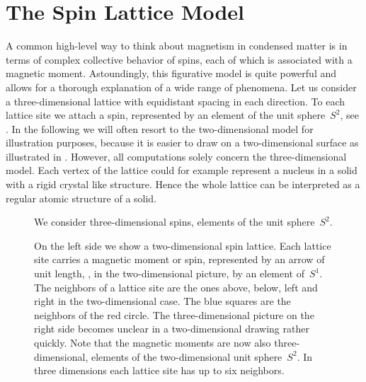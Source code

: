 \section{The Spin Lattice Model}\label{sec:model}
%
A common high-level way to think about magnetism in condensed matter is in terms
of complex collective behavior of spins, each of which is associated with a
magnetic moment. Astoundingly, this figurative model is quite powerful and
allows for a thorough explanation of a wide range of phenomena. Let us consider
a three-dimensional lattice with equidistant spacing in each direction. To each
lattice site we attach a spin, represented by an element of the unit
sphere~$S^2$, see . In the following we will often resort to the
two-dimensional model for illustration purposes, because it is easier to draw on
a two-dimensional surface as illustrated in . However, all
computations solely concern the three-dimensional model. Each vertex of the
lattice could for example represent a nucleus in a solid with a rigid crystal
like structure. Hence the whole lattice can be interpreted as a regular atomic
structure of a solid.

\begin{figure}
  \centering
  \caption{We consider three-dimensional spins, \ie{} elements of the unit
  sphere~$S^2$.}
\label{fig:s2}
\end{figure}

\begin{figure}
  \centering
  \caption{On the left side we show a two-dimensional spin lattice. Each lattice
  site carries a magnetic moment or spin, represented by an arrow of unit
  length, \ie{}, in the two-dimensional picture, by an element of~$S^1$. The
  neighbors of a lattice site are the ones above, below, left and right in the
  two-dimensional case. The blue squares are the neighbors of the red circle.
  The three-dimensional picture on the right side becomes unclear in a
  two-dimensional drawing rather quickly. Note that the magnetic moments are now
  also three-dimensional, \ie{} elements of the two-dimensional unit
  sphere~$S^2$. In three dimensions each lattice site has up to six neighbors.}
\label{fig:lattice}
\end{figure}

